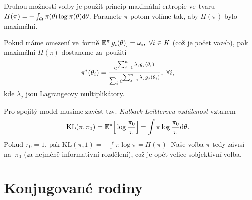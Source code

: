 Druhou možností volby je použít princip  maximální entropie ve~tvaru $H(\pi)=-\int_\Theta\pi(\theta)\log \pi(\theta)\mathrm{d}\theta$. Parametr $\pi$ potom volíme tak, aby $H(\pi)$ bylo maximální.

Pokud máme omezení ve~formě $\mathbb{E}^\pi[g_i(\theta)]=\omega_i,~\forall i\in K$ (což je počet vazeb), pak maximální $H(\pi)$ dostaneme za~použití $$\pi^\ast(\theta_i)=\frac{\mathrm{e}^{\sum_{j=1}^n \lambda_j g_j(\theta_i)}}{\sum_i \mathrm{e}^{\sum_{j=1}^n \lambda_jg_j(\theta_i)}},~\forall i,$$
kde $\lambda_j$ jsou Lagrangeovy multiplikátory.

Pro spojitý model musíme zavést tzv. \textit{Kulback-Leiblerovu vzdálenost} vztahem
$$ \mathrm{KL}(\pi,\pi_0)=\mathbb{E}^\pi\Big[\log\frac{\pi_0}{\pi}\Big]=\int\pi\log\frac{\pi_0}{\pi}\mathrm{d}\theta.$$
Pokud $\pi_0=1$, pak $\mathrm{KL}(\pi,1)=-\int\pi\log\pi=H(\pi)$. Naše volba $\pi$ tedy závisí na~$\pi_0$ (za nejméně informativní rozdělení), což je opět velice sobjektivní volba.

\section{Konjugované rodiny}

